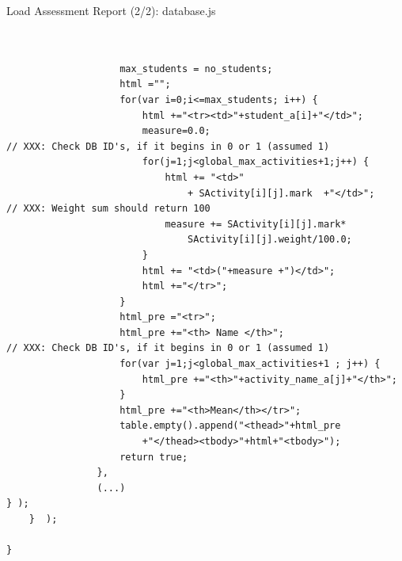 \begin{bclogo}[couleur=blue!30,arrondi=0.1,ombre=true ] 
{Load Assessment Report (2/2): database.js \label{load_assessment_2}}
\begin{verbatim}
                    
                    
                    max_students = no_students;
                    html ="";
                    for(var i=0;i<=max_students; i++) {
                        html +="<tr><td>"+student_a[i]+"</td>";
                        measure=0.0;
// XXX: Check DB ID's, if it begins in 0 or 1 (assumed 1)
                        for(j=1;j<global_max_activities+1;j++) {
                            html += "<td>" 
                                + SActivity[i][j].mark  +"</td>";
// XXX: Weight sum should return 100
                            measure += SActivity[i][j].mark*
                                SActivity[i][j].weight/100.0;
                        }
                        html += "<td>("+measure +")</td>";
                        html +="</tr>";
                    }
                    html_pre ="<tr>";
                    html_pre +="<th> Name </th>";
// XXX: Check DB ID's, if it begins in 0 or 1 (assumed 1)
                    for(var j=1;j<global_max_activities+1 ; j++) {
                        html_pre +="<th>"+activity_name_a[j]+"</th>";
                    }
                    html_pre +="<th>Mean</th></tr>";
                    table.empty().append("<thead>"+html_pre
                        +"</thead><tbody>"+html+"<tbody>");
                    return true;
                },
                (...)
} );
    }  );

}

\end{verbatim}
\end{bclogo}

